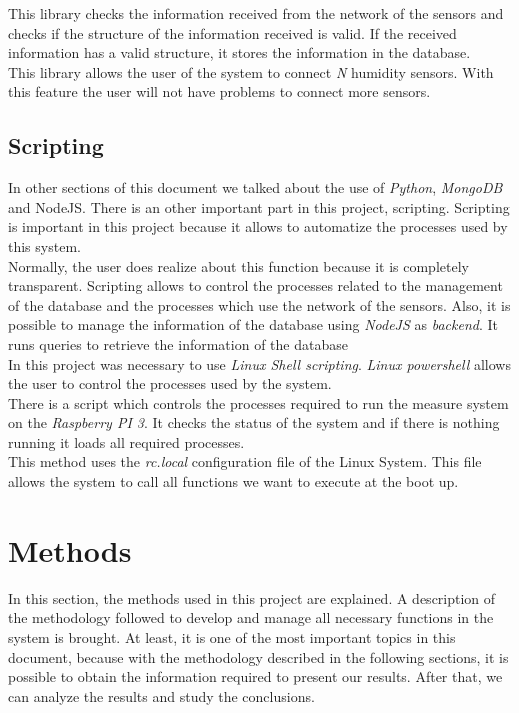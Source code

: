 This library checks the information received from the network of the sensors and checks if the structure of the information received is valid. If the received information has a valid structure, it stores the information in the database.\\

This library allows the user of the system to connect \textit{N} humidity sensors. With this feature the user will not have problems to connect more sensors.

\subsection{Scripting}

In other sections of this document we talked about the use of \textit{Python}, \textit{MongoDB} and NodeJS. There is an other important part in this project, scripting. Scripting is important in this project because it allows to automatize the processes used by this system.\\

Normally, the user does realize about this function because it is completely transparent. Scripting allows to control the processes related to the management of the database and the processes which use the network of the sensors. Also, it is possible to manage the information of the database using \textit{NodeJS} as \textit{backend}. It runs queries to retrieve the information of the database\\

In this project was necessary to use \textit{Linux Shell scripting}. \textit{Linux powershell} allows the user to control the processes used by the system.\\

There is a script which controls the processes required to run the measure system on the \textit{Raspberry PI 3}. It checks the status of the system and if there is nothing running it loads all required processes.\\

This method uses the \textit{rc.local} configuration file of the Linux System. This file allows the system to call all functions we want to execute at the boot up.

\section{Methods}

In this section, the methods used in this project are explained. A description of the methodology followed to develop and manage all necessary functions in the system is brought. At least, it is one of the most important topics in this document, because with the methodology described in the following sections, it is possible to obtain the information required to present our results. After that, we can analyze the results and study the conclusions.

